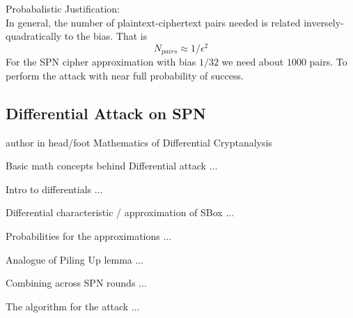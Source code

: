 \documentclass[9pt]{beamer}
\begin{document}
\begin{frame}
Probabalistic Justification:\\
\vspace{5mm}
In general, the number of plaintext-ciphertext pairs needed is related inversely-quadratically to the bias. That is
\[ N_{pairs} \approx 1 / \epsilon^2 \]
For the SPN cipher approximation with bias $1/32$ we need about $1000$ pairs. To perform the attack with near full probability of success.
\end{frame}

\subsection{Differential Attack on SPN}
\begin{frame}
\begin{beamercolorbox}[ht=2.5ex,dp=1.125ex,center,rounded=true,shadow=true]{author in head/foot}
Mathematics of Differential Cryptanalysis
\end{beamercolorbox}
\end{frame}

\begin{frame}
Basic math concepts behind Differential attack ...

\end{frame}

\begin{frame}
Intro to differentials ...

\end{frame}

\begin{frame}
Differential characteristic / approximation of SBox ...

\end{frame}

\begin{frame}
Probabilities for the approximations ...

\end{frame}

\begin{frame}
Analogue of Piling Up lemma ...

\end{frame}

\begin{frame}
Combining across SPN rounds ...

\end{frame}

\begin{frame}
The algorithm for the attack ...

\end{frame}
\end{document}
